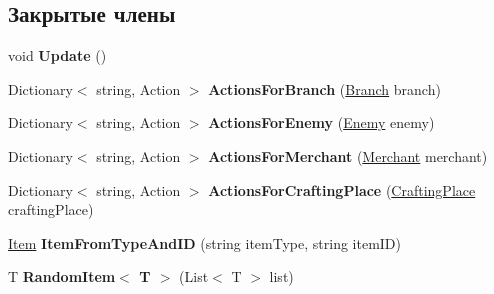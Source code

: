 \subsection*{Закрытые члены}
\begin{DoxyCompactItemize}
\item 
\hypertarget{class_a_s_c_i_i_wars_1_1_game_1_1_game_controller_a168ed9c7f70798346a3065e677214871}{}\label{class_a_s_c_i_i_wars_1_1_game_1_1_game_controller_a168ed9c7f70798346a3065e677214871} 
void {\bfseries Update} ()
\item 
\hypertarget{class_a_s_c_i_i_wars_1_1_game_1_1_game_controller_abfc9b4635cf21b9844662a0f1ce7993b}{}\label{class_a_s_c_i_i_wars_1_1_game_1_1_game_controller_abfc9b4635cf21b9844662a0f1ce7993b} 
Dictionary$<$ string, Action $>$ {\bfseries Actions\+For\+Branch} (\hyperlink{class_a_s_c_i_i_wars_1_1_game_1_1_branch}{Branch} branch)
\item 
\hypertarget{class_a_s_c_i_i_wars_1_1_game_1_1_game_controller_a0f3e92a2a298e49bfbec224ee4a0fd16}{}\label{class_a_s_c_i_i_wars_1_1_game_1_1_game_controller_a0f3e92a2a298e49bfbec224ee4a0fd16} 
Dictionary$<$ string, Action $>$ {\bfseries Actions\+For\+Enemy} (\hyperlink{class_a_s_c_i_i_wars_1_1_game_1_1_enemy}{Enemy} enemy)
\item 
\hypertarget{class_a_s_c_i_i_wars_1_1_game_1_1_game_controller_a93b504c8814e5658df686507b3151697}{}\label{class_a_s_c_i_i_wars_1_1_game_1_1_game_controller_a93b504c8814e5658df686507b3151697} 
Dictionary$<$ string, Action $>$ {\bfseries Actions\+For\+Merchant} (\hyperlink{class_a_s_c_i_i_wars_1_1_game_1_1_merchant}{Merchant} merchant)
\item 
\hypertarget{class_a_s_c_i_i_wars_1_1_game_1_1_game_controller_ad827f61946b4ff1002037b33cc18aa9d}{}\label{class_a_s_c_i_i_wars_1_1_game_1_1_game_controller_ad827f61946b4ff1002037b33cc18aa9d} 
Dictionary$<$ string, Action $>$ {\bfseries Actions\+For\+Crafting\+Place} (\hyperlink{class_a_s_c_i_i_wars_1_1_game_1_1_crafting_place}{Crafting\+Place} crafting\+Place)
\item 
\hypertarget{class_a_s_c_i_i_wars_1_1_game_1_1_game_controller_ae1df2975647f93103b5c6ed923b19150}{}\label{class_a_s_c_i_i_wars_1_1_game_1_1_game_controller_ae1df2975647f93103b5c6ed923b19150} 
\hyperlink{class_a_s_c_i_i_wars_1_1_game_1_1_item}{Item} {\bfseries Item\+From\+Type\+And\+ID} (string item\+Type, string item\+ID)
\item 
\hypertarget{class_a_s_c_i_i_wars_1_1_game_1_1_game_controller_a1baba3acfeebe23dc52d89befa516335}{}\label{class_a_s_c_i_i_wars_1_1_game_1_1_game_controller_a1baba3acfeebe23dc52d89befa516335} 
T {\bfseries Random\+Item$<$ T $>$} (List$<$ T $>$ list)
\end{DoxyCompactItemize}
